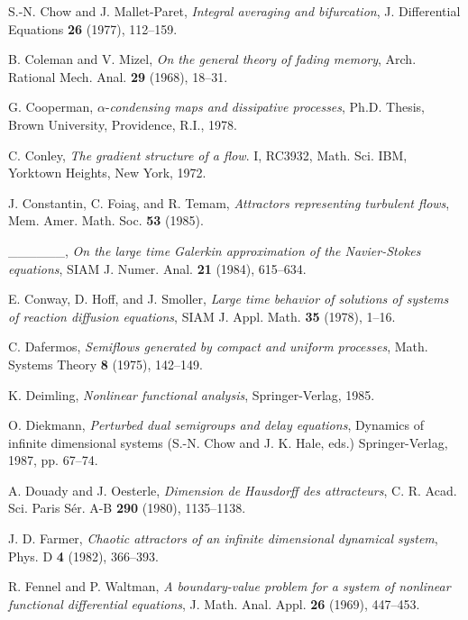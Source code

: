 \documentclass{surv-l}
\theoremstyle{plain}
\theoremstyle{definition}
\numberwithin{equation}{section}
\numberwithin{figure}{chapter}
\begin{document}
\begin{thebibliography}{}
\bibitem[Chow(1977)]{1977cm} S.-N. Chow and J. Mallet-Paret, \emph{Integral averaging and bifurcation}, J. Differential Equations \textbf{26} (1977), 112--159.

\bibitem[Coleman(1968)]{1968cm} B. Coleman and V. Mizel, \emph{On the general theory of fading memory}, Arch. Rational Mech. Anal. \textbf{29} (1968), 18--31.

 G. Cooperman, $\alpha$-\emph{condensing maps and dissipative processes}, Ph.D. Thesis, Brown University, Providence, R.I., 1978.

 C. Conley, \emph{The gradient structure of a flow}. I, RC3932, Math. Sci. IBM, Yorktown Heights, New York, 1972.

 J. Constantin, C. Foia\c{s}, and R. Temam, \emph{Attractors representing turbulent flows}, Mem. Amer. Math. Soc. \textbf{53} (1985).

 \_\_\_\_\_\_, \emph{On the large time Galerkin approximation of the Navier-Stokes equations}, SIAM J. Numer. Anal. \textbf{21} (1984), 615--634.

 E. Conway, D. Hoff, and J. Smoller, \emph{Large time behavior of solutions of systems of reaction diffusion equations}, SIAM J. Appl. Math. \textbf{35} (1978), 1--16.

 C. Dafermos, \emph{Semiflows generated by compact and uniform processes}, Math. Systems Theory \textbf{8} (1975), 142--149.

 K. Deimling, \emph{Nonlinear functional analysis}, Springer-Verlag, 1985.

 O. Diekmann, \emph{Perturbed dual semigroups and delay equations}, Dynamics of infinite dimensional systems (S.-N. Chow and J. K. Hale, eds.) Springer-Verlag, 1987, pp. 67--74.

 A. Douady and J. Oesterle, \emph{Dimension de Hausdorff des attracteurs}, C. R. Acad. Sci. Paris S\'{e}r. A-B \textbf{290} (1980), 1135--1138.

 J. D. Farmer, \emph{Chaotic attractors of an infinite dimensional dynamical system}, Phys. D \textbf{4} (1982), 366--393.

 R. Fennel and P. Waltman, \emph{A boundary-value problem for a system of nonlinear functional differential equations}, J. Math. Anal. Appl. \textbf{26} (1969), 447--453.


\end{thebibliography}
\end{document}
